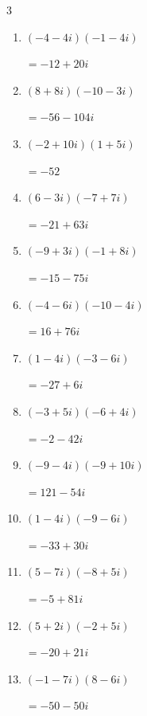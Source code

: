 \begin{multicols}{3}
\begin{enumerate}
        $\displaystyle =74+76i$

  \item $\displaystyle (-4-4i)(-1-4i)$

        $\displaystyle =-12+20i$

  \item $\displaystyle (8+8i)(-10-3i)$

        $\displaystyle =-56-104i$

  \item $\displaystyle (-2+10i)(1+5i)$

        $\displaystyle =-52$

\columnbreak %

  \item $\displaystyle (6-3i)(-7+7i)$

        $\displaystyle =-21+63i$

  \item $\displaystyle (-9+3i)(-1+8i)$

        $\displaystyle =-15-75i$

  \item $\displaystyle (-4-6i)(-10-4i)$

        $\displaystyle =16+76i$

  \item $\displaystyle (1-4i)(-3-6i)$

        $\displaystyle =-27+6i$

  \item $\displaystyle (-3+5i)(-6+4i)$

        $\displaystyle =-2-42i$

  \item $\displaystyle (-9-4i)(-9+10i)$

        $\displaystyle =121-54i$

  \item $\displaystyle (1-4i)(-9-6i)$

        $\displaystyle =-33+30i$

  \item $\displaystyle (5-7i)(-8+5i)$

        $\displaystyle =-5+81i$

  \item $\displaystyle (5+2i)(-2+5i)$

        $\displaystyle =-20+21i$

  \item $\displaystyle (-1-7i)(8-6i)$

        $\displaystyle =-50-50i$


\end{enumerate}
\end{multicols}
